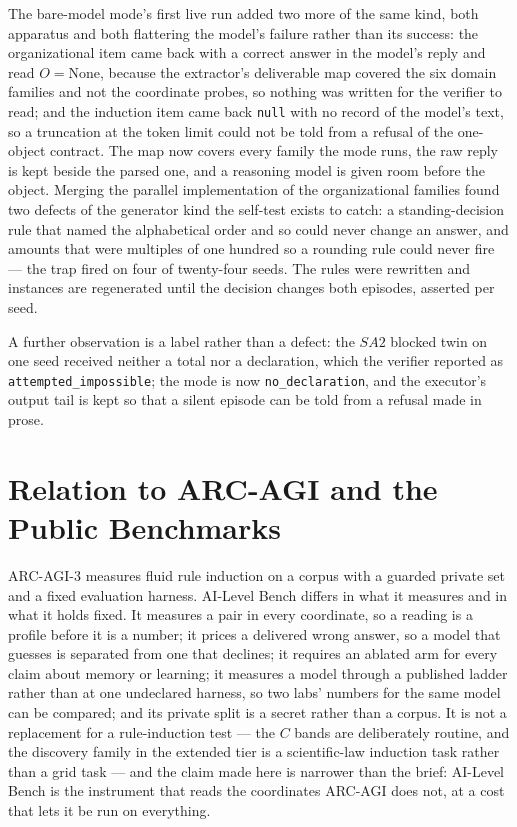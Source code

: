 The bare-model mode's first live run added two more of the same kind, both apparatus and both flattering the model's failure rather than its success: the organizational item came back with a correct answer in the model's reply and read $O = \text{None}$, because the extractor's deliverable map covered the six domain families and not the coordinate probes, so nothing was written for the verifier to read; and the induction item came back \texttt{null} with no record of the model's text, so a truncation at the token limit could not be told from a refusal of the one-object contract. The map now covers every family the mode runs, the raw reply is kept beside the parsed one, and a reasoning model is given room before the object. Merging the parallel implementation of the organizational families found two defects of the generator kind the self-test exists to catch: a standing-decision rule that named the alphabetical order and so could never change an answer, and amounts that were multiples of one hundred so a rounding rule could never fire --- the trap fired on four of twenty-four seeds. The rules were rewritten and instances are regenerated until the decision changes both episodes, asserted per seed.

A further observation is a label rather than a defect: the $SA2$ blocked twin on one seed received neither a total nor a declaration, which the verifier reported as \texttt{attempted\_impossible}; the mode is now \texttt{no\_declaration}, and the executor's output tail is kept so that a silent episode can be told from a refusal made in prose.

\section{Relation to ARC-AGI and the Public Benchmarks}\label{sec:relation}

ARC-AGI-3 \citep{arc2026} measures fluid rule induction on a corpus with a guarded private set and a fixed evaluation harness. AI-Level Bench differs in what it measures and in what it holds fixed. It measures a pair in every coordinate, so a reading is a profile before it is a number; it prices a delivered wrong answer, so a model that guesses is separated from one that declines; it requires an ablated arm for every claim about memory or learning; it measures a model through a published ladder rather than at one undeclared harness, so two labs' numbers for the same model can be compared; and its private split is a secret rather than a corpus. It is not a replacement for a rule-induction test --- the $C$ bands are deliberately routine, and the discovery family in the extended tier is a scientific-law induction task rather than a grid task --- and the claim made here is narrower than the brief: AI-Level Bench is the instrument that reads the coordinates ARC-AGI does not, at a cost that lets it be run on everything.

